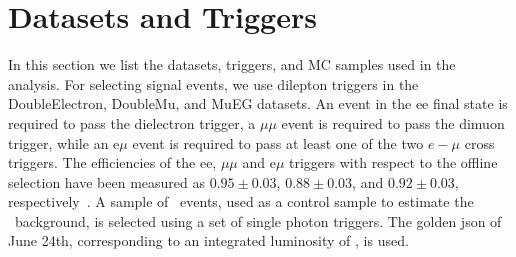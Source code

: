 \clearpage

\section{Datasets and Triggers}
\label{sec:datasets}

In this section we list the datasets, triggers, and MC samples used in the analysis. For selecting signal
events, we use dilepton triggers in the DoubleElectron, DoubleMu, and MuEG datasets. 
An event in the ee final state is required to pass the dielectron trigger, a 
$\mu\mu$ event is required to pass the dimuon trigger, while an e$\mu$ event is required to pass at least one 
of the two $e-\mu$ cross triggers. The efficiencies of the ee, $\mu\mu$ and e$\mu$ triggers with respect to the
offline selection have been measured as $0.95\pm0.03$, $0.88\pm0.03$, and $0.92\pm0.03$, respectively~\cite{ref:SSAN}.  
A sample of \gjets\ events, used as a control sample to estimate the \zjets\
background, is selected using a set of single photon triggers.
The golden json of June 24th, corresponding to an integrated luminosity of \lumi, is used. 

